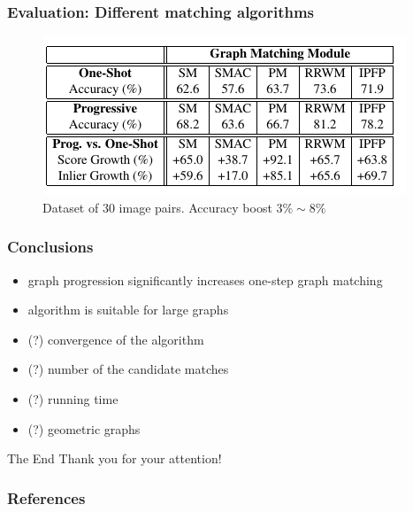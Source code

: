 \documentclass[hyperref={pdfpagelabels=false}]{beamer}
\begin{document}
\begin{frame}
 \frametitle{Evaluation: Different matching algorithms}
 \begin{figure}
  \includegraphics[scale=0.7]{fig_table1.png}
  \caption{Dataset of $30$ image pairs. Accuracy boost $3\%\sim 8\%$}
 \end{figure}

\end{frame}


\begin{frame}
 \frametitle{Conclusions}
 \begin{itemize}
  \item graph progression significantly increases one-step graph matching
  \item algorithm is suitable for large graphs
  \vspace{30pt}
  
  \item (?) convergence of the algorithm
  \item (?) number of the candidate matches
  \item (?) running time
  \item (?) geometric graphs
 \end{itemize}

\end{frame}

\begin{frame}{The End}
\centering
\LARGE
\color{red}
 Thank you for your attention!
 
 \nocite{MinsuChoSubb}
\end{frame}

\begin{frame} [allowframebreaks]
	\frametitle{References}
	
	
\end{frame} 
\end{document}
